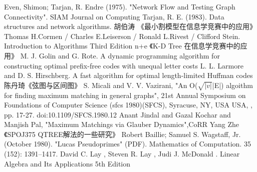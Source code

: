 \begin{thebibliography}{999}
	 Even, Shimon; Tarjan, R. Endre (1975).
	"Network Flow and Testing Graph Connectivity".
    SIAM Journal on Computing
     Tarjan, R. E. (1983).
    Data structures and network algorithms.
    胡伯涛 《最小割模型在信息学竞赛中的应用》
      Thomas H.Cormen / Charles E.Leiserson /
     Ronald L.Rivest / Clifford Stein.
     Introduction to Algorithms Third Edition
    n+e 《K-D Tree 在信息学竞赛中的应用》
    M. J. Golin and G. Rote.
    A dynamic programming algorithm for constructing optimal
    prefix-free codes with unequal letter costs
    L. L. Larmore and D. S. Hirschberg.
    A fast algorithm for optimal length-limited Huffman codes
     陈丹琦《弦图与区间图》
    S. Micali and V. V. Vazirani,
    "An O($\sqrt{|v|}$|E|) algoithm for finding maximum matching
    in general graphs",
     21st Annual Symposium on Foundations of Computer Science (sfcs 1980)(SFCS),
     Syracuse, NY, USA USA, , pp. 17-27.
    doi:10.1109/SFCS.1980.12
     Anant Jindal and Gazal Kochar and Manjish Pal,
    "Maximum Matchings via Glauber Dynamics",CoRR
     Yang Zhe 《SPOJ375 QTREE解法的一些研究》
     Robert Baillie; Samuel S. Wagstaff, Jr. (October 1980).
     "Lucas Pseudoprimes" (PDF). Mathematics of Computation. 35 (152):
      1391–1417.
      David C. Lay , Steven R. Lay , Judi J. McDonald .
    Linear Algebra and Its Applications 5th Edition
\end{thebibliography}
